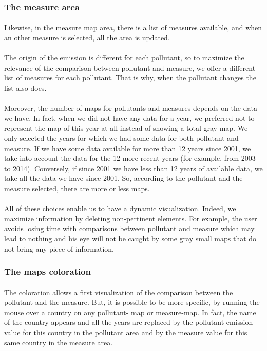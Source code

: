 \documentclass[preprint,journal]{vgtc}       %
\begin{document}
\subsubsection{The measure area}
\paragraph{}
Likewise, in the measure map area, there is a list of measures available, and when an other measure is selected, all the area is updated. 
\paragraph{}
The origin of the emission is different for each pollutant, so to maximize the relevance of the comparison between pollutant and measure, we offer a different list of measures for each pollutant. That is why, when the pollutant changes the list also does.
\paragraph{}
Moreover, the number of maps for pollutants and measures depends on the data we have. In fact, when we did not have any data for a year, we preferred not to represent the map of this year at all instead of showing a total gray map. We only selected the years for which we had some data for both pollutant and measure. 
\newline
If we have some data available for more than 12 years since 2001, we take into account the data for the 12 more recent years (for example, from 2003 to 2014). Conversely, if since 2001 we have less than 12 years of available data, we take all the data we have since 2001. So, according to the pollutant and the measure selected, there are more or less maps.
\paragraph{}
All of these choices enable us to have a dynamic visualization. Indeed, we maximize information by deleting non-pertinent elements. For example, the user avoids losing time with comparisons between pollutant and measure which may lead to nothing and his eye will not be caught by some gray small maps that do not bring any piece of information.

\subsubsection{The maps coloration}
\paragraph{}
The coloration allows a first visualization of the comparison between the pollutant and the measure. But, it is possible to be more specific, by running the mouse over a country on any pollutant- map or measure-map. 
\newline
In fact, the name of the country appears and all the years are replaced by the pollutant emission value for this country in the pollutant area and by the measure value for this same country in the measure area.
\end{document}
